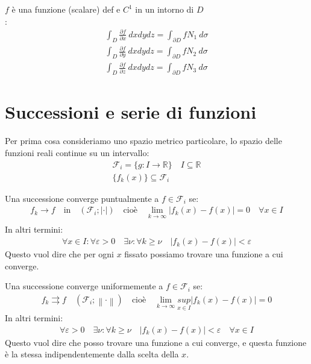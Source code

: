 \documentclass[a4paper, oneside]{article}
\begin{document}
\begin{proposition}
   $f$ è una funzione (scalare) def e $C^1$ in un intorno di $D$\\
  :
  \begin{gather*}
    \int_D \frac{\partial f}{\partial x} \ dxdydz = \int_{\partial D} f N_1 \ d\sigma \\
    \int_D \frac{\partial f}{\partial y} \ dxdydz = \int_{\partial D} f N_2 \ d\sigma \\
    \int_D \frac{\partial f}{\partial z} \ dxdydz = \int_{\partial D} f N_3 \ d\sigma
  \end{gather*}
\end{proposition}


\section{Successioni e serie di funzioni}
Per prima cosa consideriamo uno spazio metrico particolare, lo spazio delle funzioni reali continue su un intervallo:
\begin{gather*}
  \mathcal{F}_i = \{ g: I \to \mathbb{R} \} \quad I \subseteq \mathbb{R}\\
  \{f_k (x)\} \subseteq \mathcal{F}_i
\end{gather*} 

\begin{definition}
  Una successione converge puntualmente a $f \in \mathcal{F}_i$ se:
  \begin{gather*}
    f_k \to f \quad \text{in} \quad (\mathcal{F}_i ; | \cdot |) \quad \text{cioè} \quad \lim_{k \to \infty} |f_k(x) - f(x)| = 0 \quad \forall x \in I\\
  \end{gather*}
  In altri termini:
  \begin{gather*}
    \forall x \in I : \forall \varepsilon > 0 \quad \exists \nu : \forall k \geq \nu \quad |f_k(x) - f(x)| < \varepsilon
  \end{gather*}
  Questo vuol dire che per ogni $x$ fissato possiamo trovare una funzione a cui converge.
\end{definition}
  
\begin{definition}
  Una successione converge uniformemente a $f \in \mathcal{F}_i$ se:
  \begin{gather*}
    f_k \rightrightarrows f \quad (\mathcal{F}_i ; \left\lVert \cdot \right\rVert ) \quad \text{cioè} \quad \lim_{k \to \infty} \underset{x \in I}{sup}\left\lvert f_k(x) - f(x) \right\rvert = 0
  \end{gather*}
  In altri termini:
  \begin{gather*}
    \forall \varepsilon > 0 \quad \exists \nu : \forall k \geq \nu \quad |f_k(x) - f(x)| < \varepsilon \quad \forall x \in I
  \end{gather*}
  Questo vuol dire che posso trovare una funzione a cui converge, e questa funzione è la stessa indipendentemente dalla scelta della $x$.
\end{definition}
\end{document}
